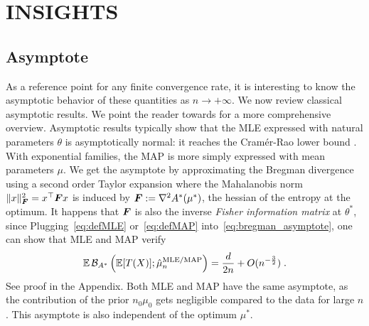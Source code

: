 \documentclass[twoside]{article}
\let\oldsection\section
\renewcommand{\section}[1]{\oldsection{\texorpdfstring{\uppercase{#1}}{#1}}}
\newcommand{\logpart}{A}
\newcommand{\conj}{\logpart^*}
\newcommand{\bregmanconj}{\cB_{\logpart^*}}
\newcommand{\nat}{\theta}
\newcommand{\m}{\mu}
\newcommand{\meanp}{\m}
\begin{document}
\section{Insights}
\label{sec:insights}

\subsection{Asymptote}
As a reference point for any finite convergence rate, it is interesting to know the asymptotic behavior of these quantities as $n \rightarrow +\infty$.
We now review classical asymptotic results. 
We point the reader towards \citet[\S1.1]{ostrovskii2021finite} for a more comprehensive overview.
Asymptotic results typically show that the MLE expressed with natural parameters $\nat$ is asymptotically normal: it reaches the Cramér-Rao lower bound \citep[for instance Ch4.2]{vdv1998asymptotic}.
With exponential families, the MAP is more simply expressed with mean parameters $\meanp$.
We get the asymptote by approximating the Bregman divergence using a second order Taylor expansion
\alignn{
    \bregmanconj(\m^* ; \m)
    &= \frac{\norm{\m^* - \m}^2_{\mF}}{2}
    + O(\norm{\m - \m^*}^3),
    \label{eq:bregman_asymptote}
}
where the Mahalanobis norm  $\| x \|_{{\bm{F}}}^2 = x^\top {\bm{F}} x$  is induced by $\mF  := \nabla^2\conj(\m^*)$, the hessian of the entropy at the optimum. It happens that  ${\bm{F}}$ is also the inverse \textit{Fisher information matrix} at $\nat^*$, since
\aligns{
    \mF
    :=\nabla^2\conj(\m^*)
    = \nabla^2\logpart(\nat^*)^{-1}
    = \Cov_{\nat^*}[T(X)]^{-1}  \; .
}
Plugging~\eqref{eq:defMLE} or~\eqref{eq:defMAP} into~\eqref{eq:bregman_asymptote}, one can show that MLE and MAP verify 
\begin{align}
	\label{eq:MAP_asymptote}
	\E \bregmanconj \left (\E [T(X)] ; \hat \meanp_n^\text{MLE/MAP} \right )
	= \frac{d}{2n} + O(n^{- \frac{3}{2}}) \; .
\end{align}
See proof in the Appendix.
Both MLE and MAP have the same asymptote, as the contribution of the prior $n_0 \meanp_0$ gets negligible compared to the data for large $n$.
This asymptote is also independent of the optimum $\meanp^*$.
\end{document}
